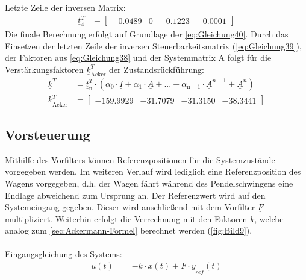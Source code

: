 \newline
Letzte Zeile der inversen Matrix:
\begin{align} \label{eq:Gleichung39}
    \underline{t}_{\mathrm{4}}^T &=
    \begin{bmatrix}
        -0.0489 & 0 & -0.1223 & -0.0001
    \end{bmatrix}
\end{align}
\newline
Die finale Berechnung erfolgt auf Grundlage der \autoref{eq:Gleichung40}. Durch das Einsetzen der letzten Zeile der inversen Steuerbarkeitsmatrix (\autoref{eq:Gleichung39}), der Faktoren aus \autoref{eq:Gleichung38} und der Systemmatrix A folgt für die Verstärkungsfaktoren $\underline{k}^T_{\mathrm{Acker}}$ der Zustandsrückführung:
\begin{align}
    \underline{k}^T &= \underline{t}_{\mathrm{n}}^T\cdot(\alpha_{\mathrm{0}}\cdot\underline{I} + \alpha_{\mathrm{1}}\cdot \underline{A} + ... + \alpha_{\mathrm{n-1}}\cdot \underline{A}^{n-1}+\underline{A}^n) \label{eq:Gleichung40}\\
    \underline{k}^T_{\mathrm{Acker}} &=
    \begin{bmatrix}
        -159.9929 & -31.7079 & -31.3150 & -38.3441
    \end{bmatrix} \label{eq:Gleichung41}
\end{align}

\subsection{Vorsteuerung}

Mithilfe des Vorfilters können Referenzpositionen für die Systemzustände vorgegeben werden. Im weiteren Verlauf wird lediglich eine Referenzposition des Wagens vorgegeben, d.h. der Wagen fährt während des Pendelschwingens eine Endlage abweichend zum Ursprung an. Der Referenzwert wird auf den Systemeingang gegeben. Dieser wird anschließend mit dem Vorfilter $\underline{F}$ multipliziert. Weiterhin erfolgt die Verrechnung mit den Faktoren $\underline{k}$, welche analog zum \autoref{sec:Ackermann-Formel} berechnet werden (\autoref{fig:Bild9}).\\\\
Eingangsgleichung des Systems:
\begin{align}\label{eq:Gleichung42}
    \underline{u}(t) &= -\underline{k}\cdot\underline{x}(t)+\underline{F}\cdot\underline{y}_{ref}(t)
\end{align}

